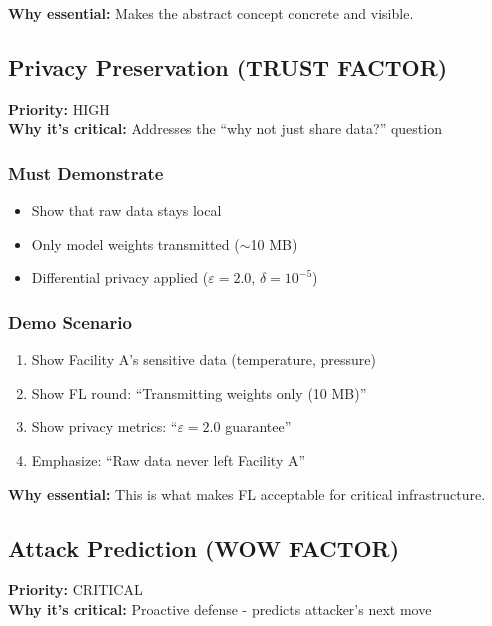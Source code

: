 \documentclass[11pt,a4paper]{article}
\begin{document}
\textbf{Why essential:} Makes the abstract concept concrete and visible.

\subsection{Privacy Preservation (TRUST FACTOR)}

\textbf{Priority:} \textcolor{high}{HIGH} \\
\textbf{Why it's critical:} Addresses the ``why not just share data?'' question

\subsubsection{Must Demonstrate}

\begin{itemize}[leftmargin=*]
    \item Show that raw data stays local
    \item Only model weights transmitted ($\sim$10 MB)
    \item Differential privacy applied ($\varepsilon=2.0$, $\delta=10^{-5}$)
\end{itemize}

\subsubsection{Demo Scenario}

\begin{enumerate}[leftmargin=*]
    \item Show Facility A's sensitive data (temperature, pressure)
    \item Show FL round: ``Transmitting weights only (10 MB)''
    \item Show privacy metrics: ``$\varepsilon=2.0$ guarantee''
    \item Emphasize: ``Raw data never left Facility A''
\end{enumerate}

\textbf{Why essential:} This is what makes FL acceptable for critical infrastructure.


\subsection{Attack Prediction (WOW FACTOR)}

\textbf{Priority:} \textcolor{critical}{CRITICAL} \\
\textbf{Why it's critical:} Proactive defense - predicts attacker's next move
\end{document}
